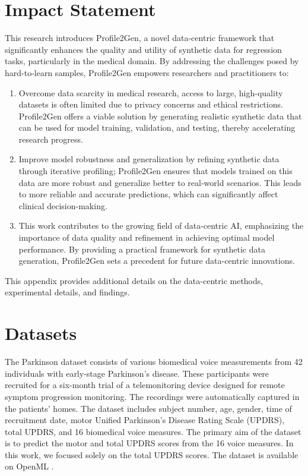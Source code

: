 \documentclass{article}
\theoremstyle{plain}
\theoremstyle{definition}
\theoremstyle{remark}
\begin{document}
\section*{Impact Statement}

This research introduces Profile2Gen, a novel data-centric framework that significantly enhances the quality and utility of synthetic data for regression tasks, particularly in the medical domain. By addressing the challenges posed by hard-to-learn samples, Profile2Gen empowers researchers and practitioners to:

\begin{enumerate}
\item Overcome data scarcity in medical research, access to large, high-quality datasets is often limited due to privacy concerns and ethical restrictions. Profile2Gen offers a viable solution by generating realistic synthetic data that can be used for model training, validation, and testing, thereby accelerating research progress.
    
\item Improve model robustness and generalization by refining synthetic data through iterative profiling; Profile2Gen ensures that models trained on this data are more robust and generalize better to real-world scenarios. This leads to more reliable and accurate predictions, which can significantly affect clinical decision-making.

\item This work contributes to the growing field of data-centric AI, emphasizing the importance of data quality and refinement in achieving optimal model performance. By providing a practical framework for synthetic data generation, Profile2Gen sets a precedent for future data-centric innovations.

\end{enumerate}






\newpage

\appendix
\onecolumn

This appendix provides additional details on the data-centric methods, experimental details, and findings.

\section{Datasets} \label{sec:appendicesdatasets}

The Parkinson dataset \cite{tsanas2009accurate} consists of various biomedical voice measurements from 42 individuals with early-stage Parkinson's disease. These participants were recruited for a six-month trial of a telemonitoring device designed for remote symptom progression monitoring. The recordings were automatically captured in the patients' homes. The dataset includes subject number, age, gender, time of recruitment date, motor Unified Parkinson's Disease Rating Scale (UPDRS), total UPDRS, and 16 biomedical voice measures. The primary aim of the dataset is to predict the motor and total UPDRS scores from the 16 voice measures. In this work, we focused solely on the total UPDRS scores. The dataset is available on OpenML \cite{openml_4531}.
\end{document}
